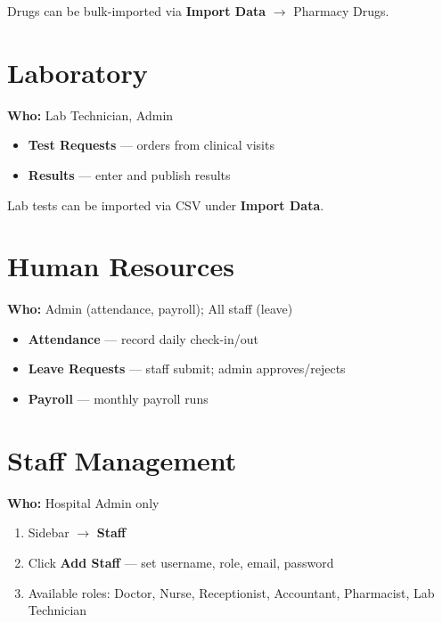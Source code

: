 \documentclass[11pt,a4paper]{report}
\begin{document}
Drugs can be bulk-imported via \textbf{Import Data} $\rightarrow$ Pharmacy Drugs.

\chapter{Laboratory}

\textbf{Who:} Lab Technician, Admin

\begin{itemize}[noitemsep]
    \item \textbf{Test Requests} --- orders from clinical visits
    \item \textbf{Results} --- enter and publish results
\end{itemize}

Lab tests can be imported via CSV under \textbf{Import Data}.

\chapter{Human Resources}

\textbf{Who:} Admin (attendance, payroll); All staff (leave)

\begin{itemize}[noitemsep]
    \item \textbf{Attendance} --- record daily check-in/out
    \item \textbf{Leave Requests} --- staff submit; admin approves/rejects
    \item \textbf{Payroll} --- monthly payroll runs
\end{itemize}

\chapter{Staff Management}

\textbf{Who:} Hospital Admin only

\begin{enumerate}[noitemsep]
    \item Sidebar $\rightarrow$ \textbf{Staff}
    \item Click \textbf{Add Staff} --- set username, role, email, password
    \item Available roles: Doctor, Nurse, Receptionist, Accountant, Pharmacist, Lab Technician
\end{enumerate}
\end{document}
